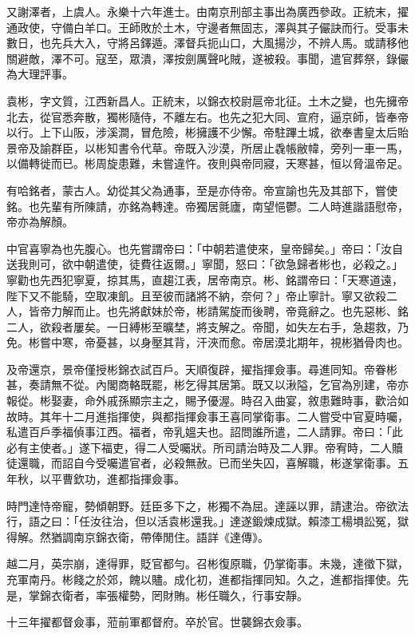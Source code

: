 \begin{pinyinscope}
又謝澤者，上虞人。永樂十六年進士。由南京刑部主事出為廣西參政。正統末，擢通政使，守備白羊口。王師敗於土木，守邊者無固志，澤與其子儼訣而行。受事未數日，也先兵大入，守將呂鐸遁。澤督兵扼山口，大風揚沙，不辨人馬。或請移他關避敵，澤不可。寇至，眾潰，澤按劍厲聲叱賊，遂被殺。事聞，遣官葬祭，錄儼為大理評事。

袁彬，字文質，江西新昌人。正統末，以錦衣校尉扈帝北征。土木之變，也先擁帝北去，從官悉奔散，獨彬隨侍，不離左右。也先之犯大同、宣府，逼京師，皆奉帝以行。上下山阪，涉溪澗，冒危險，彬擁護不少懈。帝駐蹕土城，欲奉書皇太后貽景帝及諭群臣，以彬知書令代草。帝既入沙漠，所居止毳帳敝幃，旁列一車一馬，以備轉徙而已。彬周旋患難，未嘗違忤。夜則與帝同寢，天寒甚，恒以脅溫帝足。

有哈銘者，蒙古人。幼從其父為通事，至是亦侍帝。帝宣諭也先及其部下，嘗使銘。也先輩有所陳請，亦銘為轉達。帝獨居氈廬，南望悒鬱。二人時進諧語慰帝，帝亦為解顏。

中官喜寧為也先腹心。也先嘗謂帝曰：「中朝若遣使來，皇帝歸矣。」帝曰：「汝自送我則可，欲中朝遣使，徒費往返爾。」寧聞，怒曰：「欲急歸者彬也，必殺之。」寧勸也先西犯寧夏，掠其馬，直趨江表，居帝南京。彬、銘謂帝曰：「天寒道遠，陛下又不能騎，空取凍飢。且至彼而諸將不納，奈何？」帝止寧計。寧又欲殺二人，皆帝力解而止。也先將獻妹於帝，彬請駕旋而後聘，帝竟辭之。也先惡彬、銘二人，欲殺者屢矣。一日縛彬至曠埜，將支解之。帝聞，如失左右手，急趨救，乃免。彬嘗中寒，帝憂甚，以身壓其背，汗浹而愈。帝居漠北期年，視彬猶骨肉也。

及帝還京，景帝僅授彬錦衣試百戶。天順復辟，擢指揮僉事。尋進同知。帝眷彬甚，奏請無不從。內閣商輅既罷，彬乞得其居第。既又以湫隘，乞官為別建，帝亦報從。彬娶妻，命外戚孫顯宗主之，賜予優渥。時召入曲宴，敘患難時事，歡洽如故時。其年十二月進指揮使，與都指揮僉事王喜同掌衛事。二人嘗受中官夏時囑，私遣百戶季福偵事江西。福者，帝乳媼夫也。詔問誰所遣，二人請罪。帝曰：「此必有主使者。」遂下福吏，得二人受囑狀。所司請治時及二人罪。帝宥時，二人贖徒還職，而詔自今受囑遣官者，必殺無赦。已而坐失囚，喜解職，彬遂掌衛事。五年秋，以平曹欽功，進都指揮僉事。

時門達恃帝寵，勢傾朝野。廷臣多下之，彬獨不為屈。達誣以罪，請逮治。帝欲法行，語之曰：「任汝往治，但以活袁彬還我。」達遂鍛煉成獄。賴漆工楊塤訟冤，獄得解。然猶調南京錦衣衛，帶俸閒住。語詳《達傳》。

越二月，英宗崩，達得罪，貶官都勻。召彬復原職，仍掌衛事。未幾，達徵下獄，充軍南丹。彬餞之於郊，餽以贐。成化初，進都指揮同知。久之，進都指揮使。先是，掌錦衣衛者，率張權勢，罔財賄。彬任職久，行事安靜。

十三年擢都督僉事，蒞前軍都督府。卒於官。世襲錦衣僉事。


\end{pinyinscope}
